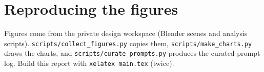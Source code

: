 \documentclass[10pt,a4paper,oneside]{article}
\begin{document}
\section{Reproducing the figures}
\raggedright
Figures come from the private design workspace (Blender scenes and analysis scripts). \texttt{scripts/collect\_figures.py} copies them,
\texttt{scripts/make\_charts.py} draws the charts, and \texttt{scripts/curate\_prompts.py} produces the curated prompt log.
Build this report with \texttt{xelatex main.tex} (twice).
\end{document}
